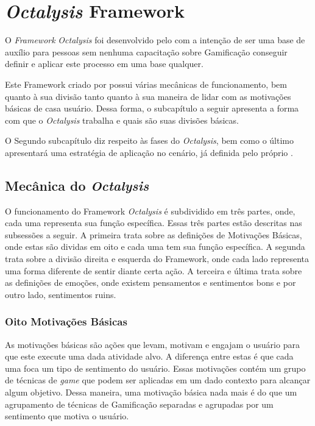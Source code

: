 \section{\textit{Octalysis} Framework}
\label{sub:octalysisframework}
O \textit{Framework} \textit{Octalysis} foi desenvolvido pelo \cite{chou2015actionable} com a intenção de ser uma
base de auxílio para pessoas sem nenhuma capacitação sobre Gamificação
conseguir definir e aplicar este processo em uma base qualquer.

Este Framework criado por \cite{chou2015actionable} possui várias mecânicas de funcionamento,
bem quanto à sua divisão tanto quanto à sua maneira de lidar com as
motivações básicas de casa usuário. Dessa forma, o subcapítulo a seguir
apresenta a forma com que o \textit{Octalysis} trabalha e quais são suas divisões básicas.

O Segundo subcapítulo diz respeito às fases do \textit{Octalysis}, bem como o último
apresentará uma estratégia de aplicação no cenário, já definida pelo próprio
\cite{chou2015actionable}.


\subsection{Mecânica do \textit{Octalysis}}
\label{sub:mecanicaoctalysis}
O funcionamento do Framework \textit{Octalysis} é subdividido em três partes, onde,
cada uma representa sua função específica. Essas três partes estão descritas
nas subsessões a seguir. A primeira trata sobre as definições de Motivações
Básicas, onde estas são dividas em oito e cada uma tem sua função específica.
A segunda trata sobre a divisão direita e esquerda do Framework, onde cada
lado representa uma forma diferente de sentir diante certa ação.
A terceira e última trata sobre as definições de emoções, onde existem
pensamentos e sentimentos bons e por outro lado, sentimentos ruins.

\subsubsection{Oito Motivações Básicas}
\label{sub:oitomotivacoesbasicas}
As motivações básicas são ações que levam, motivam e engajam
o usuário para que este execute uma dada atividade alvo.
A diferença entre estas é que cada uma foca um tipo de sentimento
do usuário. Essas motivações contém um grupo de técnicas de \textit{game}
que podem ser aplicadas em um dado contexto para alcançar algum
objetivo. Dessa maneira, uma motivação básica nada mais é do
que um agrupamento de técnicas de Gamificação separadas e agrupadas
por um sentimento que motiva o usuário.

